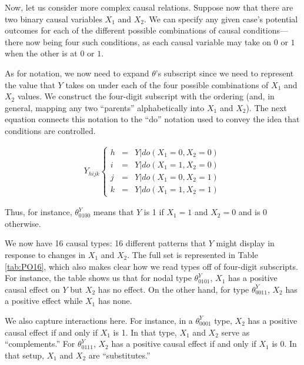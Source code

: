 \documentclass[
  12pt,
]{book}
\begin{document}
Now, let us consider more complex causal relations. Suppose now that there are two binary causal variables \(X_1\) and \(X_2\). We can specify any given case's potential outcomes for each of the different possible combinations of causal conditions---there now being four such conditions, as each causal variable may take on \(0\) or \(1\) when the other is at \(0\) or \(1\).

As for notation, we now need to expand \(\theta\)'s subscript since we need to represent the value that \(Y\) takes on under each of the four possible combinations of \(X_1\) and \(X_2\) values. We construct the four-digit subscript with the ordering (and, in general, mapping any two ``parents'' alphabetically into \(X_1\) and \(X_2\)). The next equation connects this notation to the ``do'' notation used to convey the idea that conditions are controlled.

\begin{eqnarray} 
Y_{hijk} \left\{\begin{array}{ccc}  h& =& Y|do(X_1=0, X_2=0)\\
 i &=& Y|do(X_1=1, X_2=0)\\
 j &=& Y|do(X_1=0, X_2=1)\\
 k &=& Y|do(X_1=1, X_2=1)
 \end{array} \right.
\end{eqnarray}

Thus, for instance, \(\theta^Y_{0100}\) means that \(Y\) is 1 if \(X_1=1\) and \(X_2=0\) and is 0 otherwise.

We now have 16 causal types: 16 different patterns that \(Y\) might display in response to changes in \(X_1\) and \(X_2\). The full set is represented in Table \ref{tab:PO16}, which also makes clear how we read types off of four-digit subscripts. For instance, the table shows us that for nodal type \(\theta^Y_{0101}\), \(X_1\) has a positive causal effect on \(Y\) but \(X_2\) has no effect. On the other hand, for type \(\theta^Y_{0011}\), \(X_2\) has a positive effect while \(X_1\) has none.

We also capture interactions here. For instance, in a \(\theta^Y_{0001}\) type, \(X_2\) has a positive causal effect if and only if \(X_1\) is 1. In that type, \(X_1\) and \(X_2\) serve as ``complements.'' For \(\theta^Y_{0111}\), \(X_2\) has a positive causal effect if and only if \(X_1\) is 0. In that setup, \(X_1\) and \(X_2\) are ``substitutes.''
\end{document}
